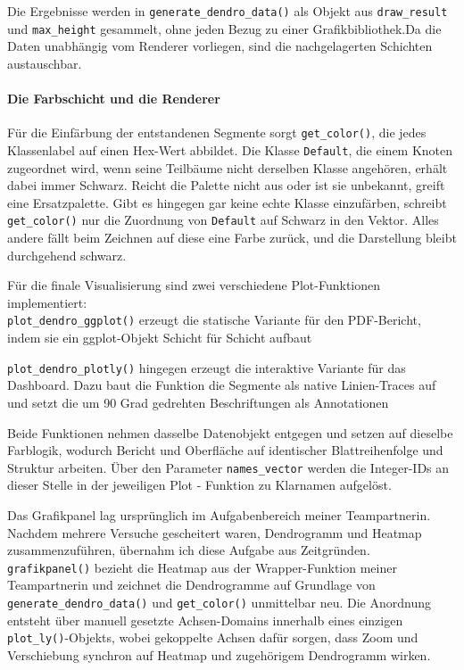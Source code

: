 \documentclass[12pt]{article}
\newcommand{\code}[1]{\texttt{#1}}
\begin{document}
Die Ergebnisse werden in \code{generate\_dendro\_data()} als Objekt aus 
\code{draw\_result} und \code{max\_height} gesammelt, ohne jeden Bezug zu einer 
Grafikbibliothek.Da die Daten unabhängig vom Renderer vorliegen, sind die nachgelagerten Schichten austauschbar.

\paragraph{Die Farbschicht und die Renderer}

Für die Einfärbung der entstandenen Segmente sorgt \code{get\_color()}, die jedes 
Klassenlabel auf einen Hex-Wert abbildet. Die Klasse \code{Default}, die einem 
Knoten zugeordnet wird, wenn seine Teilbäume nicht derselben Klasse angehören, 
erhält dabei immer Schwarz. Reicht die Palette nicht aus oder ist sie unbekannt, 
greift eine Ersatzpalette. Gibt es hingegen gar keine echte Klasse einzufärben, 
schreibt \code{get\_color()} nur die Zuordnung von \code{Default} auf Schwarz in 
den Vektor. Alles andere fällt beim Zeichnen auf diese eine Farbe zurück, und die 
Darstellung bleibt durchgehend schwarz.

Für die finale Visualisierung sind zwei verschiedene Plot-Funktionen implementiert:       \\
\code{plot\_dendro\_ggplot()} erzeugt die statische Variante für den PDF-Bericht, 
indem sie ein ggplot-Objekt Schicht für Schicht aufbaut \cite{Wickham2016}

\code{plot\_dendro\_plotly()} hingegen erzeugt die interaktive Variante für das Dashboard. Dazu baut die Funktion die Segmente als native Linien-Traces auf und setzt die um 90 Grad gedrehten Beschriftungen als Annotationen \cite{Sievert2020}

Beide Funktionen nehmen dasselbe Datenobjekt entgegen und setzen auf dieselbe Farblogik, 
wodurch Bericht und Oberfläche auf identischer Blattreihenfolge und Struktur 
arbeiten. Über den Parameter \code{names\_vector} werden die Integer-IDs an dieser 
Stelle in der jeweiligen Plot - Funktion zu Klarnamen aufgelöst.

Das Grafikpanel lag ursprünglich im Aufgabenbereich meiner Teampartnerin. Nachdem mehrere Versuche gescheitert waren, Dendrogramm und Heatmap zusammenzuführen, übernahm ich diese Aufgabe aus Zeitgründen. \code{grafikpanel()} bezieht die Heatmap aus der Wrapper-Funktion meiner Teampartnerin und zeichnet die Dendrogramme auf Grundlage von \code{generate\_dendro\_data()} und \code{get\_color()} unmittelbar neu. Die Anordnung entsteht über manuell gesetzte Achsen-Domains innerhalb eines einzigen \code{plot\_ly()}-Objekts, wobei gekoppelte Achsen dafür sorgen, dass Zoom und Verschiebung synchron auf Heatmap und zugehörigem Dendrogramm wirken.
\end{document}
